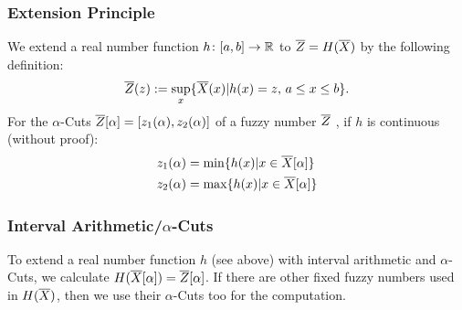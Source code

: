 \subsubsection{Extension Principle} \label{sec:extPrincFunc}
We extend a real number function $h\colon [a,b]\rightarrow\mathbb{R}$ to $\overline{Z}=H(\overline{X})$ by the following definition:
\[ \overline{Z}(z):=\sup_x\{ \overline{X}(x) | h(x)=z,\, a \leq x \leq b \}. \]
For the $\alpha$-Cuts $\overline{Z}[\alpha]=[z_1(\alpha), z_2(\alpha)]$ of a fuzzy number $\overline{Z}$ , if $h$ is continuous (without proof):
\begin{align*}
z_1(\alpha) &= \min\{ h(x) | x\in\overline{X}[\alpha] \} \\
z_2(\alpha) &= \max\{ h(x) | x\in\overline{X}[\alpha] \}
\end{align*}

\subsubsection{Interval Arithmetic/$\alpha$-Cuts} \label{sec:intArithmFunc}
To extend a real number function $h$ (see above) with interval arithmetic and $\alpha$-Cuts, we calculate $H(\overline{X}[\alpha])=\overline{Z}[\alpha]$. If there are other fixed fuzzy numbers used in $H(\overline{X})$, then we use their $\alpha$-Cuts too for the computation.

